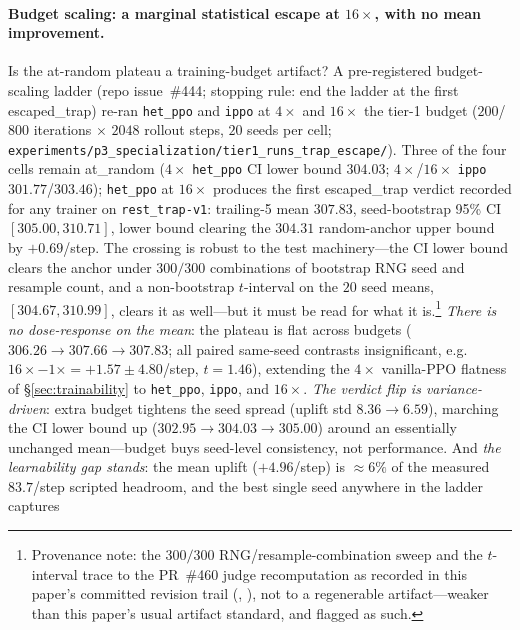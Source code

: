 \documentclass{anvil-paper}
\begin{document}
\paragraph{Budget scaling: a marginal statistical escape at
$16{\times}$, with no mean improvement.}
Is the at-random plateau a training-budget artifact? A pre-registered
budget-scaling ladder (repo issue~\#444; stopping rule: end the ladder
at the first \textsf{escaped\_trap}) re-ran \texttt{het\_ppo} and
\texttt{ippo} at $4{\times}$ and $16{\times}$ the tier-1 budget
($200$/$800$ iterations $\times$ $2048$ rollout steps, $20$ seeds per
cell;
\texttt{experiments/p3\_specialization/tier1\_runs\_trap\_escape/}).
Three of the four cells remain \textsf{at\_random} ($4{\times}$
\texttt{het\_ppo} CI lower bound $304.03$; $4{\times}$/$16{\times}$
\texttt{ippo} $301.77$/$303.46$); \texttt{het\_ppo} at $16{\times}$
produces the first \textsf{escaped\_trap} verdict recorded for any
trainer on \texttt{rest\_trap-v1}: trailing-5 mean $307.83$,
seed-bootstrap 95\% CI $[305.00, 310.71]$, lower bound clearing the
$304.31$ random-anchor upper bound by $+0.69$/step. The crossing is
robust to the test machinery---the CI lower bound clears the anchor
under $300/300$ combinations of bootstrap RNG seed and resample count,
and a non-bootstrap $t$-interval on the $20$ seed means,
$[304.67, 310.99]$, clears it as well---but it must be read for what
it is.\footnote{Provenance note: the $300/300$ RNG/resample-combination
sweep and the $t$-interval trace to the PR~\#460 judge recomputation as
recorded in this paper's committed revision trail
(,
), not to a
regenerable  artifact---weaker than this paper's
usual artifact standard, and flagged as such.} \emph{There is no
dose-response on the mean}: the plateau is
flat across budgets ($306.26 \to 307.66 \to 307.83$; all paired
same-seed contrasts insignificant, e.g.\
$16{\times}{-}1{\times} = {+}1.57 \pm 4.80$/step, $t{=}1.46$),
extending the $4{\times}$ vanilla-PPO flatness of
\S\ref{sec:trainability} to \texttt{het\_ppo}, \texttt{ippo}, and
$16{\times}$. \emph{The verdict flip is variance-driven}: extra budget
tightens the seed spread (uplift std $8.36 \to 6.59$), marching the CI
lower bound up ($302.95 \to 304.03 \to 305.00$) around an essentially
unchanged mean---budget buys seed-level consistency, not performance.
And \emph{the learnability gap stands}: the mean uplift
(${+}4.96$/step) is ${\approx}6\%$ of the measured $83.7$/step scripted
headroom, and the best single seed anywhere in the ladder captures
\end{document}
